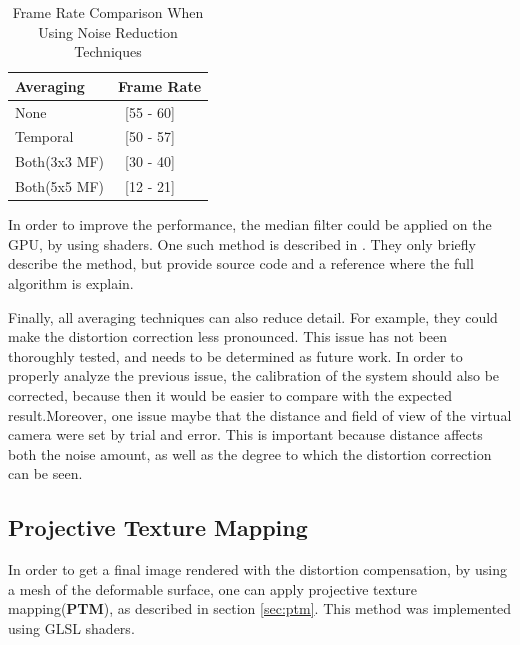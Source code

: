 \documentclass[]{article}
\begin{document}
\begin{table}
\begin{center}
    \begin{tabular}{ | l | l |}
    \hline
    Averaging & Frame Rate \\ \hline
    None & ~[55 - 60] \\ \hline
    Temporal & ~[50 - 57] \\ \hline
    Both(3x3 MF) & ~[30 - 40] \\ \hline
    Both(5x5 MF) & ~[12 - 21] \\
    \hline
    \end{tabular}    
    
\end{center}
\caption{Frame Rate Comparison When Using Noise Reduction Techniques}
\label{tabel:FrameRateReductionDueToAveraging}
\end{table}

In order to improve the performance, the median filter could be applied on the GPU, by using shaders. One such method  is described in \cite{park}. They only briefly describe the method, but provide source code and a reference where the full algorithm is explain.

Finally, all averaging techniques can also reduce detail. For example, they could make the distortion correction less pronounced. This issue has not been thoroughly tested, and needs to be determined as future work. In order to properly analyze the previous issue, the calibration of the system should also be corrected, because then it would be easier to compare with the expected result.Moreover, one issue maybe that the distance and field of view of the virtual camera were set by trial and error. This is important because distance affects both the noise amount, as well as the degree to which the distortion correction can be seen.

\subsection{Projective Texture Mapping}

In order to get a final image rendered with the distortion compensation, by using a mesh of the deformable surface, one can apply projective texture mapping(\textbf{PTM}), as described in section \ref{sec:ptm}. This method was implemented using GLSL shaders.
\end{document}
